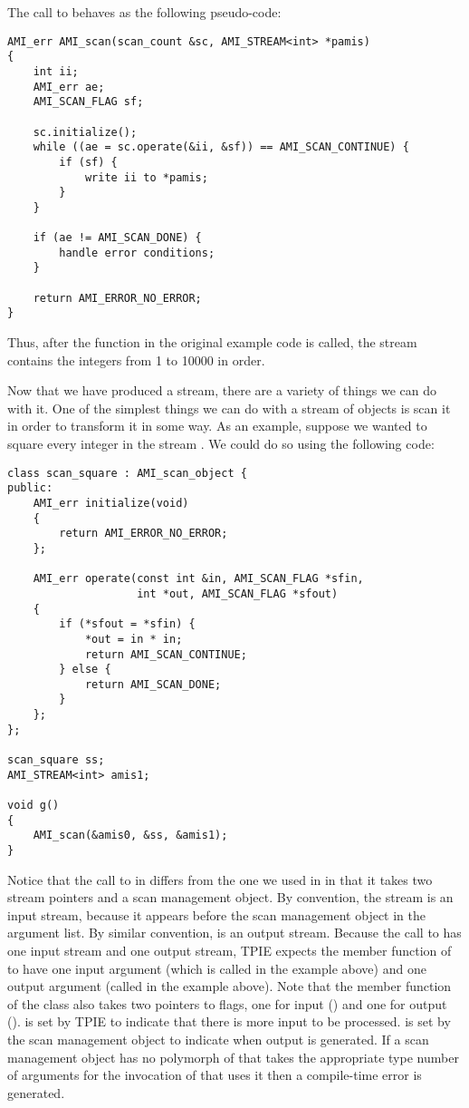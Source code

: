 The call to  behaves as the following pseudo-code:

\begin{verbatim} 
AMI_err AMI_scan(scan_count &sc, AMI_STREAM<int> *pamis)
{
    int ii;
    AMI_err ae;    
    AMI_SCAN_FLAG sf;

    sc.initialize();    
    while ((ae = sc.operate(&ii, &sf)) == AMI_SCAN_CONTINUE) {
        if (sf) {
            write ii to *pamis;
        }
    }

    if (ae != AMI_SCAN_DONE) {
        handle error conditions;
    }

    return AMI_ERROR_NO_ERROR;
}
\end{verbatim}

Thus, after the function  in the original example code is
called, the stream  contains the integers from 1 to 10000
in order.

Now that we have produced a stream, there are a variety of things we
can do with it.  One of the simplest things we can do with a stream of
objects is scan it in order to transform it in some way.  As an
example, suppose we wanted to square every integer in the stream
.  We could do so using the following code:

\begin{verbatim}
class scan_square : AMI_scan_object {
public:
    AMI_err initialize(void)
    {
        return AMI_ERROR_NO_ERROR;
    };

    AMI_err operate(const int &in, AMI_SCAN_FLAG *sfin,
                    int *out, AMI_SCAN_FLAG *sfout)
    {
        if (*sfout = *sfin) {
            *out = in * in;
            return AMI_SCAN_CONTINUE;
        } else {
            return AMI_SCAN_DONE;
        }
    };
};

scan_square ss;
AMI_STREAM<int> amis1;    

void g() 
{
    AMI_scan(&amis0, &ss, &amis1);
}
\end{verbatim}

Notice that the call to  in  differs from
the one we used in  in that it takes two stream pointers and
a scan management object.  By convention, the stream  is
an input stream, because it appears before the scan management object
 in the argument list.  By similar convention, 
is an output stream.  Because the call to  has one
input stream and one output stream, TPIE expects the 
member function of  to have one input argument (which is
called  in the example above) and one output argument (called
 in the example above).  Note that the 
member function of the class  also takes two
pointers to flags, one for input () and one for output
().   is set by TPIE to indicate that there is
more input to be processed.   is set by the scan
management object to indicate when output is generated.
If a scan management object has no polymorph of  that
takes the appropriate type number of arguments for the invocation of
 that uses it then a compile-time error is generated.

